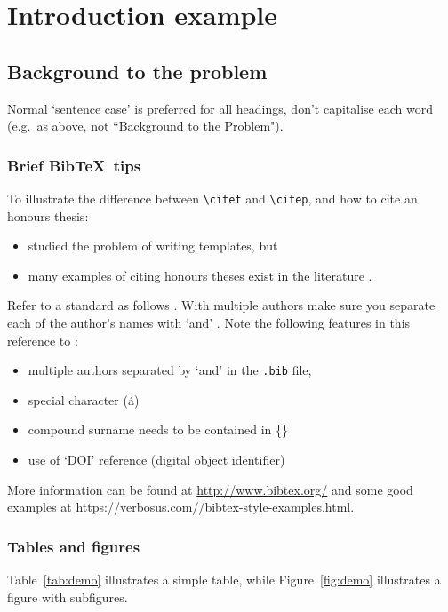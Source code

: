 \chapter{Introduction example}

\section{Background to the problem}

Normal `sentence case' is preferred for all headings, don't capitalise each word (e.g.~as above, not ``Background to the Problem").

\subsection{Brief Bib\TeX\ tips}

To illustrate the difference between \verb|\citet| and \verb|\citep|, and how to cite an honours thesis:
\begin{itemize}
  \item \citet{Smith} studied the problem of writing templates, but
  \item many examples of citing honours theses exist in the literature \citep{Smith}.
\end{itemize}
Refer to a standard as follows \citep{ISO3382-2}. With multiple authors make sure you separate each of the author's names with `and' \citep{BookExample}. Note the following features in this reference to \citet{vonKarman}:
\begin{itemize}
  \item multiple authors separated by `and' in the {\tt .bib} file,
  \item special character (\'a)
  \item compound surname needs to be contained in \{\}
  \item use of `DOI' reference (digital object identifier)  
\end{itemize}

More information can be found at \url{http://www.bibtex.org/} and some good examples at \url{https://verbosus.com//bibtex-style-examples.html}.

\subsection{Tables and figures}

Table~\ref{tab:demo} illustrates a simple table, while Figure~\ref{fig:demo} illustrates a figure with subfigures.



